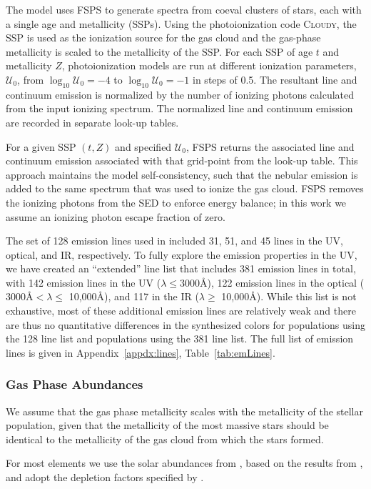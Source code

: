 \documentclass[preprint2,trackchanges]{aastex62}
\newcommand{\FSPS}{{\sc FSPS}\xspace}
\newcommand{\Cloudy}{\textsc{Cloudy}\xspace}
\newcommand{\logten}{\ensuremath{\log_{10}}}
\newcommand{\ang}{\ensuremath{\mbox{\AA}}\xspace}
\newcommand{\U}{\ensuremath{\mathcal{U}_{0}}\xspace}
\newcommand{\logUeq}[1]{\ensuremath{\logten \mathcal{U}_0 = #1}}
\begin{document}
The model uses \FSPS to generate spectra from coeval clusters of stars, each with a single age and metallicity (SSPs). Using the photoionization code \Cloudy, the SSP is used as the ionization source for the gas cloud and the gas-phase metallicity is scaled to the metallicity of the SSP. For each SSP of age $t$ and metallicity $Z$, photoionization models are run at different ionization parameters, \U, from \logUeq{-4} to \logUeq{-1} in steps of 0.5. The resultant line and continuum emission is normalized by the number of ionizing photons calculated from the input ionizing spectrum. The normalized line and continuum emission are recorded in separate look-up tables. 

For a given SSP $(t, Z)$ and specified \U{}, \FSPS returns the associated line and continuum emission associated with that grid-point from the look-up table. This approach maintains the model self-consistency, such that the nebular emission is added to the same spectrum that was used to ionize the gas cloud. \FSPS removes the ionizing photons from the SED to enforce energy balance; in this work we assume an ionizing photon escape fraction of zero.

The set of 128 emission lines used in \citet{Byler+2017} included 31, 51, and 45 lines in the UV, optical, and IR, respectively. To fully explore the emission properties in the UV, we have created an ``extended'' line list that includes 381 emission lines in total, with 142 emission lines in the UV ($\lambda \leq 3000$\ang), 122 emission lines in the optical ($3000$\ang $< \lambda \leq $ 10,000\ang), and 117 in the IR ($\lambda \geq$ 10,000\ang). While this list is not exhaustive, most of these additional emission lines are relatively weak and there are thus no quantitative differences in the synthesized colors for populations using the 128 line list and populations using the 381 line list. The full list of emission lines is given in Appendix~\ref{appdx:lines}, Table~\ref{tab:emLines}.

\subsubsection{Gas Phase Abundances}

We assume that the gas phase metallicity scales with the metallicity of the stellar population, given that the metallicity of the most massive stars should be identical to the metallicity of the gas cloud from which the stars formed. 

For most elements we use the solar abundances from \citet{Grevesse+2010}, based on the results from \citet{Asplund+2009}, and adopt the depletion factors specified by \citet{Dopita+2013}.
\end{document}
